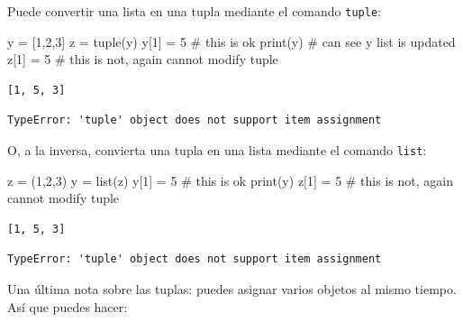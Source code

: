 \documentclass[
  letterpaper,
]{scrbook}
\newenvironment{Shaded}{\begin{snugshade}}{\end{snugshade}}
\newcommand{\BuiltInTok}[1]{\textcolor[rgb]{0.00,0.23,0.31}{#1}}
\newcommand{\CommentTok}[1]{\textcolor[rgb]{0.37,0.37,0.37}{#1}}
\newcommand{\DecValTok}[1]{\textcolor[rgb]{0.68,0.00,0.00}{#1}}
\newcommand{\NormalTok}[1]{\textcolor[rgb]{0.00,0.23,0.31}{#1}}
\newcommand{\OperatorTok}[1]{\textcolor[rgb]{0.37,0.37,0.37}{#1}}
\begin{document}
Puede convertir una lista en una tupla mediante el comando
\texttt{tuple}:

\begin{Shaded}
\begin{Highlighting}[]
\NormalTok{y }\OperatorTok{=}\NormalTok{ [}\DecValTok{1}\NormalTok{,}\DecValTok{2}\NormalTok{,}\DecValTok{3}\NormalTok{]}
\NormalTok{z }\OperatorTok{=} \BuiltInTok{tuple}\NormalTok{(y)}
\NormalTok{y[}\DecValTok{1}\NormalTok{] }\OperatorTok{=} \DecValTok{5} \CommentTok{\# this is ok}
\BuiltInTok{print}\NormalTok{(y) }\CommentTok{\# can see y list is updated}
\NormalTok{z[}\DecValTok{1}\NormalTok{] }\OperatorTok{=} \DecValTok{5} \CommentTok{\# this is not, again cannot modify tuple}
\end{Highlighting}
\end{Shaded}

\begin{verbatim}
[1, 5, 3]
\end{verbatim}

\begin{verbatim}
TypeError: 'tuple' object does not support item assignment
\end{verbatim}

O, a la inversa, convierta una tupla en una lista mediante el comando
\texttt{list}:

\begin{Shaded}
\begin{Highlighting}[]
\NormalTok{z }\OperatorTok{=}\NormalTok{ (}\DecValTok{1}\NormalTok{,}\DecValTok{2}\NormalTok{,}\DecValTok{3}\NormalTok{)}
\NormalTok{y }\OperatorTok{=} \BuiltInTok{list}\NormalTok{(z)}
\NormalTok{y[}\DecValTok{1}\NormalTok{] }\OperatorTok{=} \DecValTok{5} \CommentTok{\# this is ok}
\BuiltInTok{print}\NormalTok{(y)}
\NormalTok{z[}\DecValTok{1}\NormalTok{] }\OperatorTok{=} \DecValTok{5} \CommentTok{\# this is not, again cannot modify tuple}
\end{Highlighting}
\end{Shaded}

\begin{verbatim}
[1, 5, 3]
\end{verbatim}

\begin{verbatim}
TypeError: 'tuple' object does not support item assignment
\end{verbatim}

Una última nota sobre las tuplas: puedes asignar varios objetos al mismo
tiempo. Así que puedes hacer:
\end{document}
